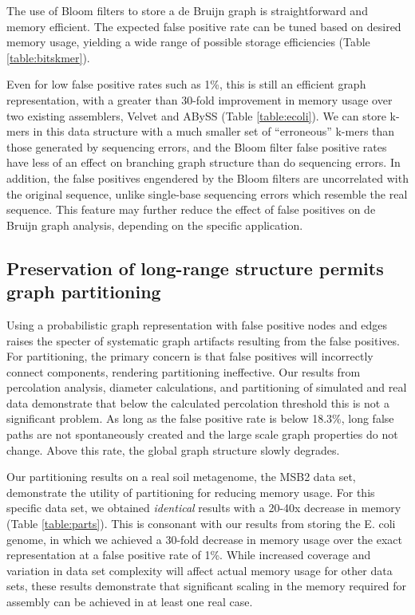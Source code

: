 \documentclass{pnastwo}
\begin{document}
\begin{article}
The use of Bloom filters to store a de Bruijn graph is
straightforward and memory efficient.  The expected false positive
rate can be tuned based on desired memory usage,
yielding a wide range of possible storage efficiencies
(Table \ref{table:bitskmer}).

Even for low false positive rates such as 1\%, this is still an
efficient graph representation, with a greater than 30-fold
improvement in memory usage over two existing assemblers, Velvet and
ABySS (Table \ref{table:ecoli}).  We can store k-mers in this data structure with a much smaller
set of ``erroneous'' k-mers than those generated by sequencing errors,
and the Bloom filter false positive rates have less of an effect on
branching graph structure than do sequencing errors.  In addition, the
false positives engendered by the Bloom filters are uncorrelated with
the original sequence, unlike single-base sequencing errors which resemble
the real sequence.  This feature may further
reduce the effect of false positives on de Bruijn graph analysis,
depending on the specific application.

\subsection{Preservation of long-range structure permits graph partitioning}

Using a probabilistic graph representation with false positive nodes
and edges raises the specter of systematic graph artifacts resulting
from the false positives.  For partitioning, the primary concern is that false
positives will incorrectly connect components, rendering partitioning
ineffective.  Our results from percolation analysis, diameter
calculations, and partitioning of simulated and real data demonstrate that
below the calculated percolation threshold this is not a significant
problem.  As long as the false positive rate is below 18.3\%,
long false paths are not spontaneously created and the
large scale graph properties do not change.  Above this rate, the global
graph structure slowly degrades.

Our partitioning results on a real soil metagenome, the MSB2 data set,
demonstrate the utility of partitioning for reducing memory usage.
For this specific data set, we obtained {\em identical} results with a
20-40x decrease in memory (Table \ref{table:parts}).  This is consonant with our results from
storing the E. coli genome, in which we achieved a 30-fold decrease
in memory usage over the exact representation at a false positive rate
of 1\%.  While increased coverage and variation in data set complexity
will affect actual memory usage for other data sets, these results demonstrate that
significant scaling in the memory required for assembly can be achieved
in at least one real case.


\end{article}
\end{document}
